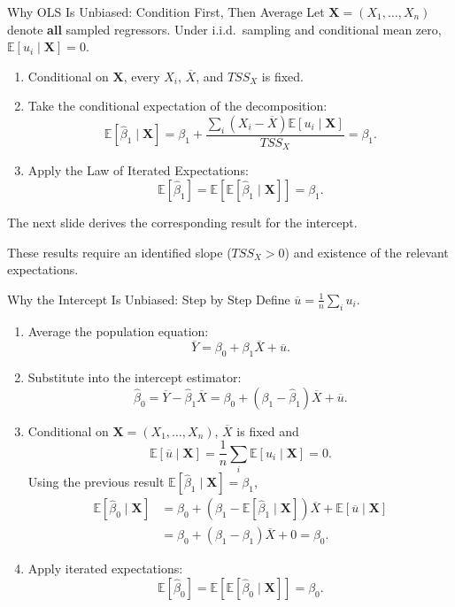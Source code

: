 \documentclass[10pt,aspectratio=169]{beamer}
\newcommand{\E}{\mathbb{E}}
\begin{document}
\begin{frame}{Why OLS Is Unbiased: Condition First, Then Average}
\small
Let $\mathbf X=(X_1,\ldots,X_n)$ denote \textbf{all} sampled regressors.
Under i.i.d.\ sampling and conditional mean zero, $\E[u_i\mid\mathbf X]=0$.
\begin{enumerate}
\item Conditional on $\mathbf X$, every $X_i$, $\overline X$, and $TSS_X$ is fixed.
\item Take the conditional expectation of the decomposition:
\[
\E[\widehat\beta_1\mid\mathbf X]
=\beta_1+\frac{\sum_i(X_i-\overline X)\E[u_i\mid\mathbf X]}{TSS_X}
=\beta_1.
\]
\item Apply the Law of Iterated Expectations:
\[
\E[\widehat\beta_1]=\E[\E[\widehat\beta_1\mid\mathbf X]]=\beta_1.
\]
\end{enumerate}
The next slide derives the corresponding result for the intercept.
\par\medskip
These results require an identified slope ($TSS_X>0$) and existence of the relevant expectations.
\end{frame}

\begin{frame}{Why the Intercept Is Unbiased: Step by Step}
\small
Define $\overline u=\frac1n\sum_i u_i$.
\begin{enumerate}
\item Average the population equation:
\[
\overline Y=\beta_0+\beta_1\overline X+\overline u.
\]
\item Substitute into the intercept estimator:
\[
\widehat\beta_0=\overline Y-\widehat\beta_1\overline X
=\beta_0+(\beta_1-\widehat\beta_1)\overline X+\overline u.
\]
\item Conditional on $\mathbf X=(X_1,\ldots,X_n)$, $\overline X$ is fixed and
\[
\E[\overline u\mid\mathbf X]=\frac1n\sum_i\E[u_i\mid\mathbf X]=0.
\]
Using the previous result $\E[\widehat\beta_1\mid\mathbf X]=\beta_1$,
\[
\begin{aligned}
\E[\widehat\beta_0\mid\mathbf X]
&=\beta_0+(\beta_1-\E[\widehat\beta_1\mid\mathbf X])\overline X
+\E[\overline u\mid\mathbf X]\\
&=\beta_0+(\beta_1-\beta_1)\overline X+0=\beta_0.
\end{aligned}
\]
\item Apply iterated expectations:
\[
\E[\widehat\beta_0]=\E[\E[\widehat\beta_0\mid\mathbf X]]=\beta_0.
\]
\end{enumerate}
\end{frame}
\end{document}

